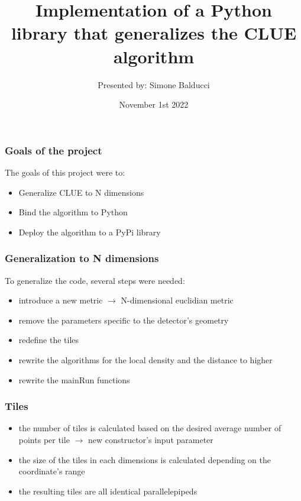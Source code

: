 \documentclass{beamer}
\title[]{Implementation of a Python library that generalizes the CLUE algorithm}
\author[Simone Balducci]{Presented by: Simone Balducci \\ \vspace{3mm}}
\institute[]{Alma Mater Studiorum-Università di Bologna}
\date{November 1st 2022}
\begin{document}
\frame{\titlepage}

\begin{frame}
\frametitle{Goals of the project}
The goals of this project were to:
\begin{itemize}
	\item Generalize CLUE to N dimensions
	\item Bind the algorithm to Python
	\item Deploy the algorithm to a PyPi library
\end{itemize}
\end{frame}
\begin{frame}
\frametitle{Generalization to N dimensions}
To generalize the code, several steps were needed:
\begin{itemize}
	\item introduce a new metric $\longrightarrow$ N-dimensional euclidian metric
	\item remove the parameters specific to the detector's geometry
	\item redefine the tiles
	\item rewrite the algorithms for the local density and the distance to higher 
	\item rewrite the mainRun functions
\end{itemize}
\end{frame}
\begin{frame}
\frametitle{Tiles}
\begin{itemize}
	\item the number of tiles is calculated based on the desired average number of points per tile $\longrightarrow$ new constructor's input parameter
	\item the size of the tiles in each dimensions is calculated depending on the coordinate's range
	\item the resulting tiles are all identical parallelepipeds
\end{itemize}
\end{frame}
\end{document}
